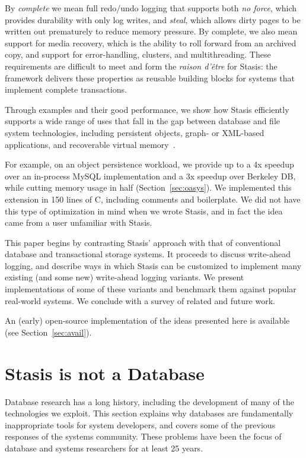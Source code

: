 \documentclass[letterpaper,twocolumn,10pt]{article}
\newcommand{\yad}{Stasis\xspace}
\newcommand{\yads}{Stasis'\xspace}
\begin{document}
By {\em complete} we mean full redo/undo logging that supports
both {\em no force}, which provides durability with only log writes,
and {\em steal}, which allows dirty pages to be written out prematurely
to reduce memory pressure. By complete, we also
mean support for media recovery, which is the ability to roll
forward from an archived copy, and support for error-handling,
clusters, and multithreading. These requirements are difficult
to meet and form the {\em raison d'\^etre} for \yad{}: the framework
delivers these properties as reusable building blocks for systems
that implement complete transactions.

Through examples and their good performance, we show how \yad{}
efficiently supports a wide range of uses that fall in the gap between 
database and file system technologies, including
persistent objects, graph- or XML-based applications, and recoverable
virtual memory~\cite{lrvm}.  

For example, on an object persistence workload, we provide up to 
a 4x speedup over an in-process MySQL implementation and a 3x speedup over Berkeley DB, while 
cutting memory usage in half (Section~\ref{sec:oasys}). 
We implemented this extension in 150 lines of C, including comments and boilerplate.  We did not have this type of optimization
in mind when we wrote \yad, and in fact the idea came from a
user unfamiliar with \yad.

This paper begins by contrasting \yads approach with that of
conventional database and transactional storage systems.  It proceeds
to discuss write-ahead logging, and describe ways in which \yad can be
customized to implement many existing (and some new) write-ahead
logging variants.  We present implementations of some of these variants and
benchmark them against popular real-world systems.  We
conclude with a survey of related and future work.

An (early) open-source implementation of
the ideas presented here is available (see Section~\ref{sec:avail}).

\section{\yad is not a Database}
\label{sec:notDB}

Database research has a long history, including the development of
many of the technologies we exploit.  This section explains
why databases are fundamentally inappropriate tools for system
developers, and covers some of the previous responses of the systems
community.  These problems have been the focus of
database and systems researchers for at least 25 years.
\end{document}
